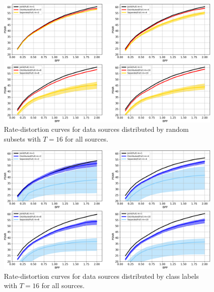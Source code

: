 \documentclass[10pt,twocolumn,letterpaper]{article}
\begin{document}
\begin{figure}
\begin{center}
\includegraphics[width=0.8\linewidth]{figure/full_subset_band.png}
\end{center}
	\vspace{-0.2cm}
   \caption{Rate-distortion curves for data sources distributed by random subsets with $T=16$ for all sources.}
   \vspace{-0.2cm}
\label{fig_4}
\end{figure}

\begin{figure}
\begin{center}
\includegraphics[width=0.8\linewidth]{figure/full_class_band.png}
\end{center}
	\vspace{-0.2cm}
   \caption{Rate-distortion curves for data sources distributed by class labels with $T=16$ for all sources.}
   \vspace{-0.2cm}
\label{fig_5}
\end{figure}
\end{document}
